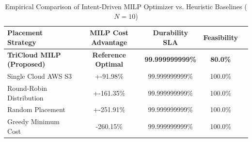 \begin{table}[t]
\centering
\caption{Empirical Comparison of Intent-Driven MILP Optimizer vs. Heuristic Baselines ($N=10$)}
\label{tab:milp_vs_baselines}
\begin{tabular}{lcccc}
\toprule
\textbf{Placement Strategy} & \textbf{MILP Cost Advantage} & \textbf{Durability SLA} & \textbf{Feasibility} \\
\midrule
\textbf{TriCloud MILP (Proposed)} & \textbf{Reference Optimal} & \textbf{99.999999999\%} & \textbf{80.0\%} \\
Single Cloud AWS S3 & +-91.98\% & 99.999999999\% & 100.0\% \\
Round-Robin Distribution & +-161.35\% & 99.999999999\% & 100.0\% \\
Random Placement & +-251.91\% & 99.999999999\% & 100.0\% \\
Greedy Minimum Cost & -260.15\% & 99.999999999\% & 100.0\% \\
\bottomrule
\end{tabular}
\end{table}


